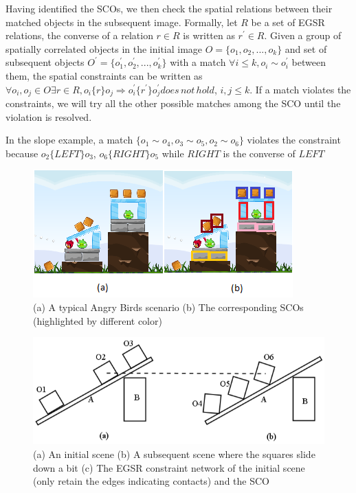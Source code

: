 \documentclass[letterpaper]{article}
\begin{document}
 Having identified the SCOs, we then check the spatial relations between their matched objects in the subsequent image. Formally, let $R$ be a set of EGSR relations, the converse of a relation $r \in R$ is written as $r^{\prime} \in R$. Given a group of spatially correlated objects in the initial image $O = \{o_1, o_2, ... , o_k\}$ and set of subsequent objects $O^\prime = \{o^{\prime}_1, o^{\prime}_2, ..., o^{\prime}_k \}$ with a match $\forall i\leq k, o_i \sim o^{\prime}_i$ between them, the spatial constraints can be written as $\forall o_i,o_j\in O\exists r\in R, o_i \{r\} o_j \Rightarrow o^{\prime}_i \{r^{\prime}\} o^{\prime}_j does\,not\,hold$, $i,j \leq k$. If a match violates the constraints, we will try all the other possible matches among the SCO until the violation is resolved. 

In the slope example, a match $\{o_1\sim o_4, o_3\sim o_5, o_2 \sim o_6\}$ violates the constraint because $o_2\{LEFT\}o_3$, $o_6\{RIGHT\}o_5$ while $RIGHT$ is the converse of $LEFT$

\begin{figure}[h!]
\centering\includegraphics[scale=0.7]{SCOScenario.png}\caption{(a) A typical Angry Birds scenario (b) The corresponding SCOs (highlighted by different color)}
\label{SCOExample}
\end{figure}

\begin{figure}[h!]
\centering\includegraphics[scale=0.3]{SCOScenario_2.png}\caption{(a) An initial scene (b) A subsequent scene where the squares slide down a bit (c) The EGSR constraint network of the initial scene (only retain the edges indicating contacts) and the SCO}
\label{SCOExample_2}
\end{figure}
\end{document}
